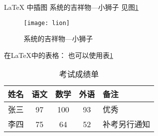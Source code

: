 \documentclass{ctexart}
\begin{document}
\LaTeX{} 中插图 系统的吉祥物---小狮子 见图\ref{fig-lion}
\begin{figure}[htbp]
    \centering
    \texttt{[image: lion]}
    \caption{系统的吉祥物---小狮子} \label{fig-lion}
\end{figure}


在\LaTeX{}中的表格：
也可以使用表\ref{tab-score}
    \begin{table}[h]
        \centering
        \caption{考试成绩单}   \label{tab-score}
        \begin{tabular}{|l ||  c | c | c | p{1.5cm} |}
            \hline
            姓名 & 语文 & 数学 & 外语 & 备注        \\
            \hline \hline
            张三 & 97   & 100 & 93  & 优秀      \\
            \hline
            李四 & 75   & 64  & 52  & 补考另行通知  \\
            \hline
        \end{tabular}
    \end{table}
\end{document}
